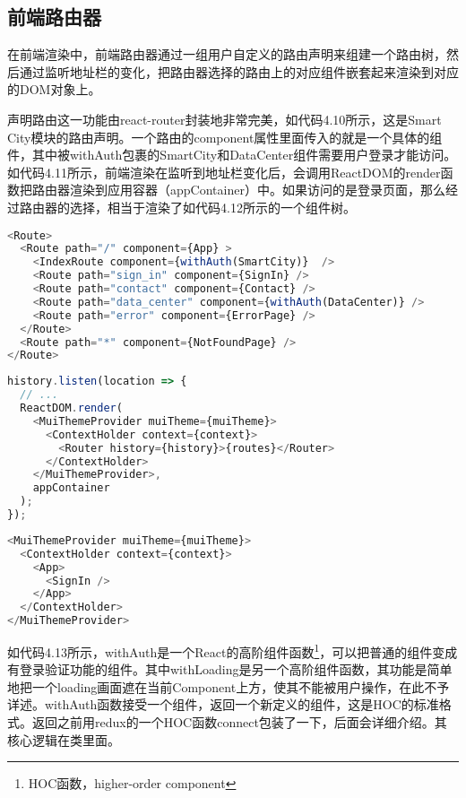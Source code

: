 \subsection{前端路由器}
在前端渲染中，前端路由器通过一组用户自定义的路由声明来组建一个路由树，然后通过监听地址栏的变化，把路由器选择的路由上的对应组件嵌套起来渲染到对应的DOM对象上。

声明路由这一功能由react-router封装地非常完美，如代码4.10所示，这是Smart City模块的路由声明。一个路由的component属性里面传入的就是一个具体的组件，其中被withAuth包裹的SmartCity和DataCenter组件需要用户登录才能访问。如代码4.11所示，前端渲染在监听到地址栏变化后，会调用ReactDOM的render函数把路由器渲染到应用容器（appContainer）中。如果访问的是登录页面，那么经过路由器的选择，相当于渲染了如代码4.12所示的一个组件树。
\begin{lstlisting}[language={JavaScript}, caption={Smart City路由声明}]
<Route>
  <Route path="/" component={App} >
    <IndexRoute component={withAuth(SmartCity)}  />
    <Route path="sign_in" component={SignIn} />
    <Route path="contact" component={Contact} />
    <Route path="data_center" component={withAuth(DataCenter)} />
    <Route path="error" component={ErrorPage} />
  </Route>
  <Route path="*" component={NotFoundPage} />
</Route>
\end{lstlisting}
\begin{lstlisting}[language={JavaScript}, caption={Smart City前端渲染}]
history.listen(location => {
  // ...
  ReactDOM.render(
    <MuiThemeProvider muiTheme={muiTheme}>
      <ContextHolder context={context}>
        <Router history={history}>{routes}</Router>
      </ContextHolder>
    </MuiThemeProvider>,
    appContainer
  );
});
\end{lstlisting}
\begin{lstlisting}[language={JavaScript}, caption={Smart City登录页面实际渲染的组件树}]
<MuiThemeProvider muiTheme={muiTheme}>
  <ContextHolder context={context}>
    <App>
      <SignIn />
    </App>
  </ContextHolder>
</MuiThemeProvider>
\end{lstlisting}

如代码4.13所示，withAuth是一个React的高阶组件函数\footnote{HOC函数，higher-order component}，可以把普通的组件变成有登录验证功能的组件。其中withLoading是另一个高阶组件函数，其功能是简单地把一个loading画面遮在当前Component上方，使其不能被用户操作，在此不予详述。withAuth函数接受一个组件，返回一个新定义的组件，这是HOC的标准格式。返回之前用redux的一个HOC函数connect包装了一下，后面会详细介绍。其核心逻辑在类里面。

